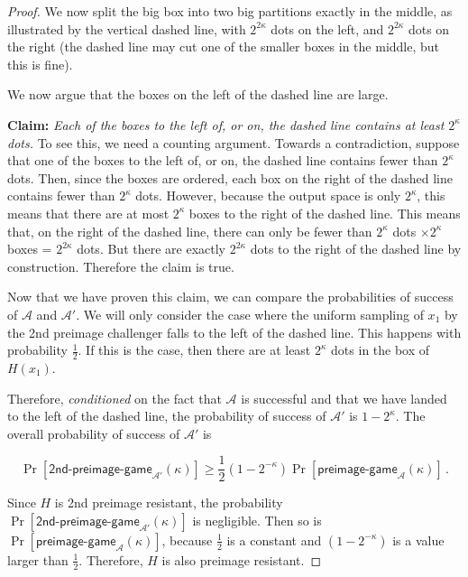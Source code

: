 \begin{proof}
  We now split the big box into two big partitions exactly in the middle, as illustrated by the vertical dashed line, with $2^{2\kappa}$ dots on the left, and $2^{2\kappa}$ dots on the right (the dashed line may cut one of the smaller boxes in the middle, but this is fine).

  We now argue that the boxes on the left of the dashed line are large.

  \textbf{Claim: } \emph{Each of the boxes to the left of, or on, the dashed line contains at least $2^\kappa$ dots.} To see this, we need a counting argument. Towards a contradiction, suppose that one of the boxes to the left of, or on, the dashed line contains fewer than $2^\kappa$ dots. Then, since the boxes are ordered, each box on the right of the dashed line contains fewer than $2^\kappa$ dots. However, because the output space is only $2^\kappa$, this means that there are at most $2^\kappa$ boxes to the right of the dashed line. This means that, on the right of the dashed line, there can only be fewer than $2^\kappa$ dots $\times 2^\kappa$ boxes = $2^{2\kappa}$ dots. But there are exactly $2^{2\kappa}$ dots to the right of the dashed line by construction. Therefore the claim is true.

  Now that we have proven this claim, we can compare the probabilities of success of $\mathcal{A}$ and $\mathcal{A}'$. We will only consider the case where the uniform sampling of $x_1$ by the 2nd preimage challenger falls to the left of the dashed line. This happens with probability $\frac{1}{2}$. If this is the case, then there are at least $2^{\kappa}$ dots in the box of $H(x_1)$.

  Therefore, \emph{conditioned} on the fact that $\mathcal{A}$ is successful and that we have landed to the left of the dashed line, the probability of success of $\mathcal{A}'$ is $1 - 2^{\kappa}$. The overall probability of success of $\mathcal{A}'$ is

  \[
    \Pr[\textsf{2nd-preimage-game}_{\mathcal{A}'}(\kappa)] \geq \frac{1}{2} (1 - 2^{-\kappa}) \Pr[\textsf{preimage-game}_\mathcal{A}(\kappa)]\,.
  \]

  Since $H$ is 2nd preimage resistant, the probability $\Pr[\textsf{2nd-preimage-game}_{\mathcal{A}'}(\kappa)]$ is negligible.
  Then so is $\Pr[\textsf{preimage-game}_\mathcal{A}(\kappa)]$, because $\frac{1}{2}$ is a constant and $(1 - 2^{-\kappa})$ is a value larger than $\frac{1}{2}$. Therefore, $H$ is also preimage resistant.
\end{proof}

